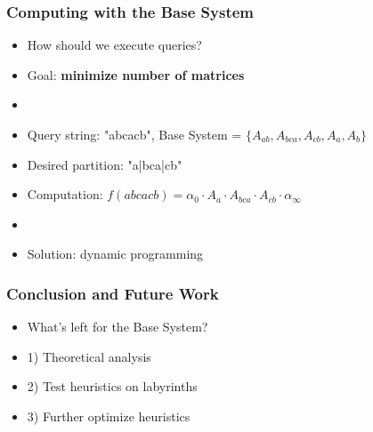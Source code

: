 \documentclass{beamer}
\begin{document}

\begin{frame}
\frametitle{Computing with the Base System}
\begin{itemize}


\item How should we execute queries?
\item[] Goal: \textbf{minimize number of matrices}
\item[]

\item[] Query string: "abcacb", Base System = $\{A_{ab}, A_{bca}, A_{cb}, A_a, A_b \}$ 


\item[] Desired partition: "a|bca|cb"
\item[] Computation: $f(abcacb)=\alpha_0 \cdot A_a \cdot A_{bca} \cdot A_{cb} \cdot \alpha_\infty$ 
\item[]

\item Solution: dynamic programming


\end{itemize}
\end{frame}


\begin{frame}
\frametitle{Conclusion and Future Work}
\begin{itemize}

\item What's left for the Base System?
\item[] 1) Theoretical analysis

\item[] 2) Test heuristics on labyrinths

\item[] 3) Further optimize heuristics


\end{itemize}
\end{frame}

\end{document}
